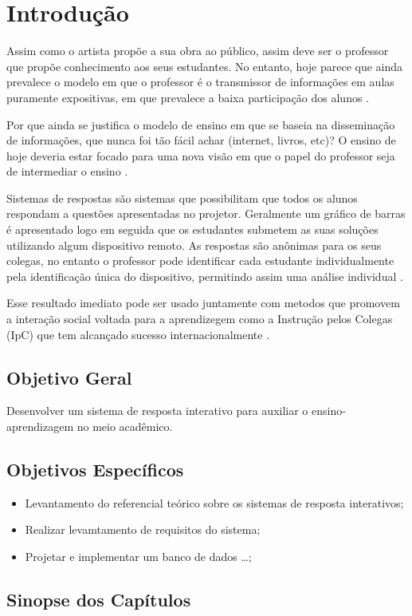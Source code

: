 \chapter{Introdução}

Assim como o artista propõe a sua obra ao público, assim deve ser o professor que
propõe conhecimento aos seus estudantes. No entanto, hoje parece que ainda prevalece
o modelo em que o professor é o transmissor de informações em aulas puramente expositivas,
em que prevalece a baixa participação dos alunos \cite[p. 8]{Silva2001}.

Por que ainda se justifica o modelo de ensino em que se baseia
na disseminação de informações, que nunca foi tão fácil achar (internet,
livros, etc)? O ensino de hoje deveria estar focado para uma nova
visão em que o papel do professor seja de intermediar o ensino \cite[p. 19]{Araujo2013}.

Sistemas de respostas são sistemas que possibilitam que todos os alunos
respondam a questões apresentadas no projetor. Geralmente um gráfico de barras
é apresentado logo em seguida que os estudantes submetem as suas soluções
utilizando algum dispositivo remoto. As respostas são anônimas para os seus colegas,
no entanto o professor pode identificar cada estudante individualmente pela
identificação única do dispositivo, permitindo assim uma análise individual \cite[p. 1]{Kay2009}.


Esse resultado imediato pode ser usado juntamente
com metodos que promovem a interação social voltada para a aprendizegem como a
Instrução pelos Colegas (IpC) que tem alcançado sucesso internacionalmente \cite[p. 3]{Araujo2013}.

\section{Objetivo Geral}
Desenvolver um sistema de resposta interativo
para auxiliar o ensino-aprendizagem no meio acadêmico.

\section{Objetivos Específicos}

\begin{itemize}
    \item Levantamento do referencial te\'orico sobre os sistemas de resposta
    interativos;
    \item Realizar levamtamento de requisitos do sistema;
    \item Projetar e implementar um banco de dados \ldots;
\end{itemize}

\section{Sinopse dos Capítulos}
